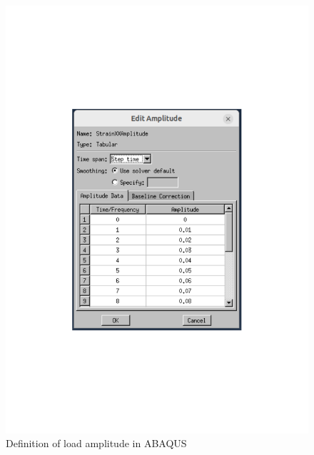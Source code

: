  

     \begin{figure}[H]
        \centering
        \begin{minipage}[T!]{1.0\textwidth}
            \centering
            \begin{minipage}[T!][9cm][T!]{0.35\textwidth}
                \includegraphics[width=1.0\textwidth]{Amplitude.pdf}
                \vfill{}
                \caption{Definition of load amplitude in ABAQUS}
                \label{fig:amplitudemenu}
            \end{minipage}
            \hspace{0.08\textwidth} %
            \begin{minipage}[T!][9cm][T!]{0.35\textwidth}

\end{minipage}
\end{minipage}
\end{figure}
